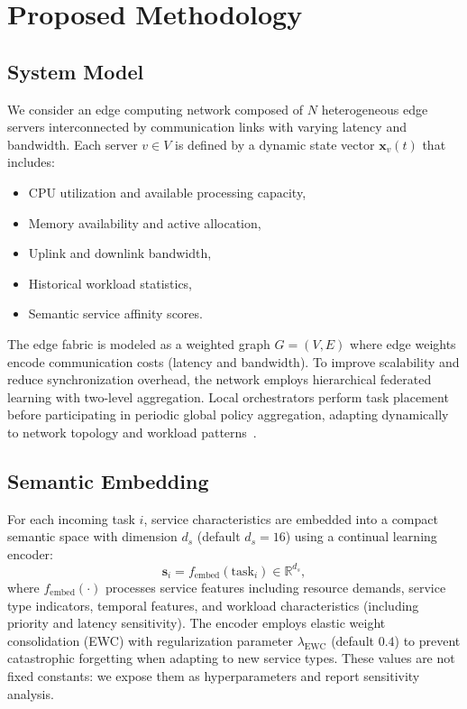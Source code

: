 \documentclass[conference]{IEEEtran}
\begin{document}
	
	\section{Proposed Methodology}
	\label{sec:methodology}
	
	\subsection{System Model}
	We consider an edge computing network composed of $N$ heterogeneous edge servers interconnected by communication links with varying latency and bandwidth. Each server $v \in V$ is defined by a dynamic state vector $\mathbf{x}_v(t)$ that includes:
	\begin{itemize}
		\item CPU utilization and available processing capacity,
		\item Memory availability and active allocation,
		\item Uplink and downlink bandwidth,
		\item Historical workload statistics,
		\item Semantic service affinity scores.
	\end{itemize}
	
	The edge fabric is modeled as a weighted graph $G = (V, E)$ where edge weights encode communication costs (latency and bandwidth). To improve scalability and reduce synchronization overhead, the network employs hierarchical federated learning with two-level aggregation. Local orchestrators perform task placement before participating in periodic global policy aggregation, adapting dynamically to network topology and workload patterns~\cite{zhou2024qos, yurdem2024federated, zhou2024robustfl}.
	
	\subsection{Semantic Embedding}
	For each incoming task $i$, service characteristics are embedded into a compact semantic space with dimension $d_s$ (default $d_s=16$) using a continual learning encoder:
	\begin{equation}
		\mathbf{s}_i = f_{\text{embed}}(\text{task}_i) \in \mathbb{R}^{d_s},
	\end{equation}
	where $f_{\text{embed}}(\cdot)$ processes service features including resource demands, service type indicators, temporal features, and workload characteristics (including priority and latency sensitivity). The encoder employs elastic weight consolidation (EWC) with regularization parameter $\lambda_{\text{EWC}}$ (default $0.4$) to prevent catastrophic forgetting when adapting to new service types. These values are not fixed constants: we expose them as hyperparameters and report sensitivity analysis.
	
\end{document}
